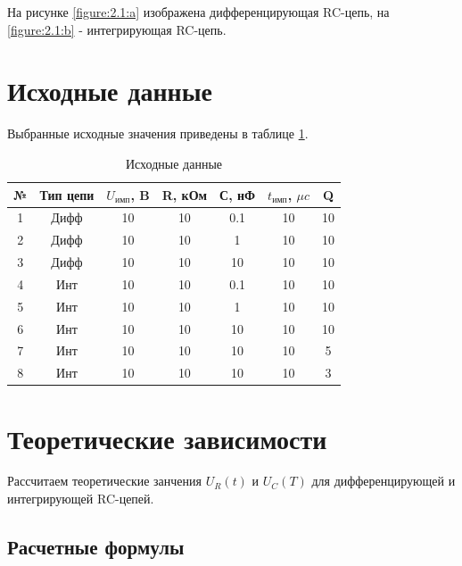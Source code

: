 На рисунке \ref{figure:2.1:a} изображена дифференцирующая RC-цепь, на \ref{figure:2.1:b} - интегрирующая RC-цепь.


\section{Исходные данные}

Выбранные исходные значения приведены в таблице \ref{tab:3:1}.

\begin{table}[H]
	\begin{center}
	\caption{Исходные данные}
	\def\arraystretch{1.5}
		\begin{tabular}{|c|c|c|c|c|c|c|}
			\hline 
			№ & Тип цепи & $U_\text{имп}$, B & R, кОм & С, нФ & $t_\text{имп}$, $\mu c$ & Q\\ 
			\hline 
			1 & Дифф & 10 & 10 & 0.1 & 10 & 10\\ 
			\hline 
			2 & Дифф & 10 & 10 & 1 & 10 & 10\\ 
			\hline 
			3 & Дифф & 10 & 10 & 10 & 10 & 10\\ 
			\hline 
			4 & Инт & 10 & 10 & 0.1 & 10 & 10\\ 
			\hline 
			5 & Инт & 10 & 10 & 1 & 10 & 10\\ 
			\hline 
			6 & Инт & 10 & 10 & 10 & 10 & 10\\
			\hline 
			7 & Инт & 10 & 10 & 10 & 10 & 5\\ 
			\hline 
			8 & Инт & 10 & 10 & 10 & 10 & 3\\ 
			\hline
		\end{tabular}
		\label{tab:3:1}
	\end{center}
\end{table}

\section{Теоретические зависимости}

Рассчитаем теоретические занчения $U_R(t)$ и $U_C(T)$ для дифференцирующей и интегрирующей RC-цепей.

\subsection{Расчетные формулы}


